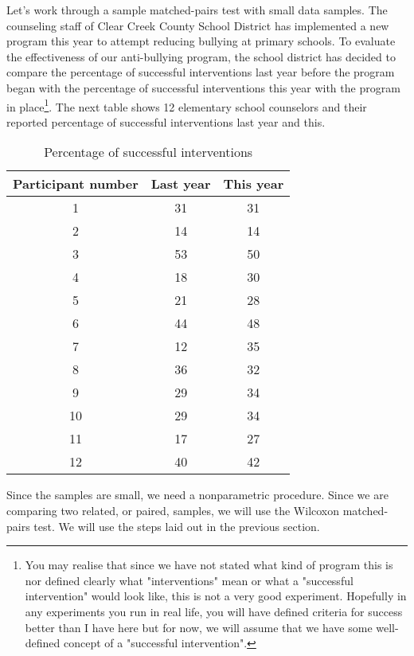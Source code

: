 Let's work through a sample matched-pairs test with small data samples. The counseling staff of Clear Creek County School District has implemented a new program this year to attempt reducing bullying at primary schools. To evaluate the effectiveness of our anti-bullying program, the school district has decided to compare the percentage of successful interventions last year before the program began with the percentage of successful interventions this year with the program in place\footnote{You may realise that since we have not stated what kind of program this is nor defined clearly what "interventions" mean or what a "successful intervention" would look like, this is not a very good experiment. Hopefully in any experiments you run in real life, you will have defined criteria for success better than I have here but for now, we will assume that we have some well-defined concept of a "successful intervention".}. The next table shows 12 elementary school counselors and their reported percentage of successful interventions last year and this.
\begin{table}[h]
    \centering %
    \begin{tabular}{|c|c|c|} %
        \hline %
        Participant number & Last year & This year \\ %
        \hline
        1 & 31 & 31 \\
        \hline
        2 & 14 & 14 \\ 
        \hline
        3 & 53 & 50 \\
        \hline
        4 & 18 & 30 \\
        \hline
        5 & 21 & 28 \\
        \hline
        6 & 44 & 48 \\
        \hline
        7 & 12 & 35 \\
        \hline
        8 & 36 & 32 \\
        \hline
        9 & 29 & 34 \\
        \hline
        10 & 29 & 34 \\
        \hline
        11 & 17 & 27 \\
        \hline
        12 & 40 & 42
    \end{tabular}
    \caption{Percentage of successful interventions} %
    \label{tab:bullying} %
\end{table}
Since the samples are small, we need a nonparametric procedure. Since we are comparing two related, or paired, samples, we will use the Wilcoxon matched-pairs test. We will use the steps laid out in the previous section.

